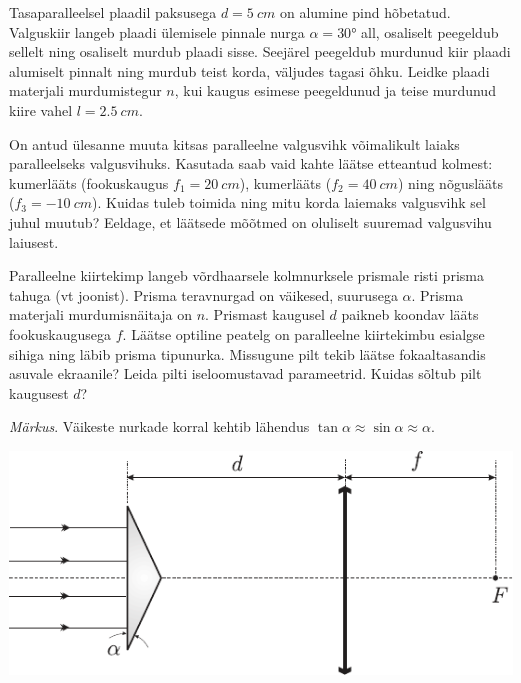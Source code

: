 \documentclass[10pt]{article}
\begin{document}
{%

Tasaparalleelsel plaadil paksusega $d = \SI{5}{cm}$ on alumine pind hõbetatud. Valguskiir langeb plaadi ülemisele pinnale nurga $\alpha = \ang{30}$ all, osaliselt peegeldub sellelt ning osaliselt murdub plaadi sisse. Seejärel peegeldub murdunud kiir plaadi alumiselt pinnalt ning murdub teist korda, väljudes tagasi õhku. Leidke plaadi materjali murdumistegur $n$, kui kaugus esimese peegeldunud ja teise murdunud kiire vahel $l = \SI{2,5}{cm}$.
\probend
\bigskip


On antud ülesanne muuta kitsas paralleelne valgusvihk võimalikult laiaks paralleelseks valgusvihuks. Kasutada saab vaid kahte läätse etteantud kolmest: kumerlääts (fookuskaugus $f_1 = \SI{20}{cm}$), kumerlääts ($f_2 = \SI{40}{cm}$) ning nõguslääts ($f_3 = \SI{-10}{cm}$). Kuidas tuleb toimida ning mitu korda laiemaks valgusvihk sel juhul muutub? Eeldage, et läätsede mõõtmed on oluliselt suuremad valgusvihu laiusest.
\probend
\bigskip


Paralleelne kiirtekimp langeb võrdhaarsele kolmnurksele prismale risti prisma tahuga (vt joonist). Prisma teravnurgad on väikesed, suurusega $\alpha$. Prisma materjali murdumisnäitaja on $n$. Prismast kaugusel $d$ paikneb koondav lääts fookuskaugusega $f$. Läätse optiline peatelg on paralleelne kiirtekimbu esialgse sihiga ning läbib prisma tipunurka. Missugune pilt tekib läätse fokaaltasandis asuvale ekraanile? Leida pilti iseloomustavad parameetrid. Kuidas sõltub pilt kaugusest $d$? 

\emph{Märkus}. Väikeste nurkade korral kehtib lähendus $\tan \alpha \approx \sin \alpha \approx \alpha$.

\begin{center}
	\includegraphics[width=\linewidth]{2006-v2g-06-yl}
\end{center}
\probend
\bigskip

}
\end{document}
